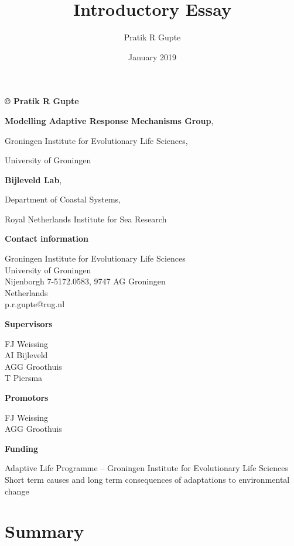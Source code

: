 \documentclass[]{scrartcl}
\title{Introductory Essay}
\author{Pratik R Gupte}
\date{January 2019}
\begin{document}
\maketitle

\newpage

\textbf{© Pratik R Gupte}

\textbf{Modelling Adaptive Response Mechanisms Group},

Groningen Institute for Evolutionary Life Sciences,

University of Groningen

\textbf{Bijleveld Lab},

Department of Coastal Systems,

Royal Netherlands Institute for Sea Research

\textbf{Contact information}

Groningen Institute for Evolutionary Life Sciences\\
University of Groningen\\
Nijenborgh 7-5172.0583, 9747 AG Groningen \\
Netherlands\\
p.r.gupte@rug.nl

\textbf{Supervisors}

FJ Weissing\\
AI Bijleveld\\
AGG Groothuis\\
T Piersma

\textbf{Promotors}

FJ Weissing\\
AGG Groothuis

\textbf{Funding}

Adaptive Life Programme -- Groningen Institute for Evolutionary Life
Sciences\\
Short term causes and long term consequences of adaptations to
environmental change

\newpage

\tableofcontents

\newpage \mbox{} \pagebreak

\part{Summary}\label{summary}
\end{document}
